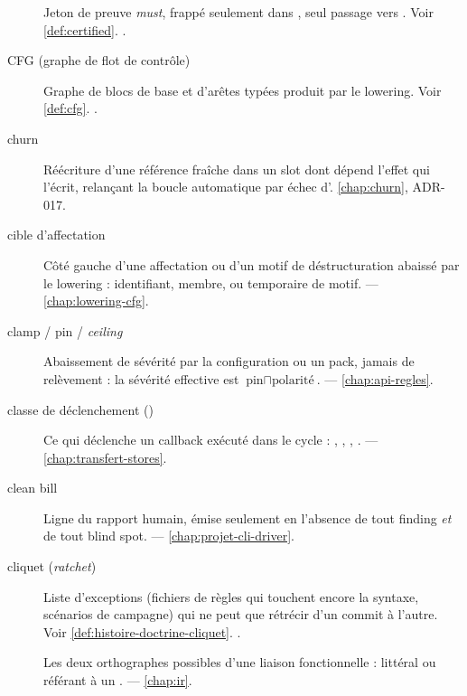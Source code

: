 \begin{description}
\item[] Jeton de preuve \emph{must}, frappé seulement dans , seul passage vers \Error{}. Voir \cref{def:certified}. .

\item[CFG (graphe de flot de contrôle)] Graphe de blocs de base et d'arêtes typées produit par le lowering. Voir \cref{def:cfg}. .

\item[churn] Réécriture d'une référence fraîche dans un slot dont dépend l'effet qui l'écrit, relançant la boucle automatique par échec d'. \cref{chap:churn}, ADR-017.

\item[cible d'affectation] Côté gauche d'une affectation ou d'un motif de déstructuration abaissé par le lowering : identifiant, membre, ou temporaire de motif.  — \cref{chap:lowering-cfg}.

\item[clamp / pin / \emph{ceiling}] Abaissement de sévérité par la configuration ou un pack, jamais de relèvement : la sévérité effective est \(\text{pin} \sqcap \text{polarité}\).  — \cref{chap:api-regles}.

\item[classe de déclenchement ()] Ce qui déclenche un callback exécuté \og dans le cycle\fg{} : , , , .  — \cref{chap:transfert-stores}.

\item[clean bill] Ligne  du rapport humain, émise seulement en l'absence de tout finding \emph{et} de tout blind spot.  — \cref{chap:projet-cli-driver}.

\item[cliquet (\emph{ratchet})] Liste d'exceptions (fichiers de règles qui touchent encore la syntaxe, scénarios de campagne) qui ne peut que rétrécir d'un commit à l'autre. Voir \cref{def:histoire-doctrine-cliquet}. .

\item[] Les deux orthographes possibles d'une liaison fonctionnelle : littéral  ou  référant à un .  — \cref{chap:ir}.


\end{description}

